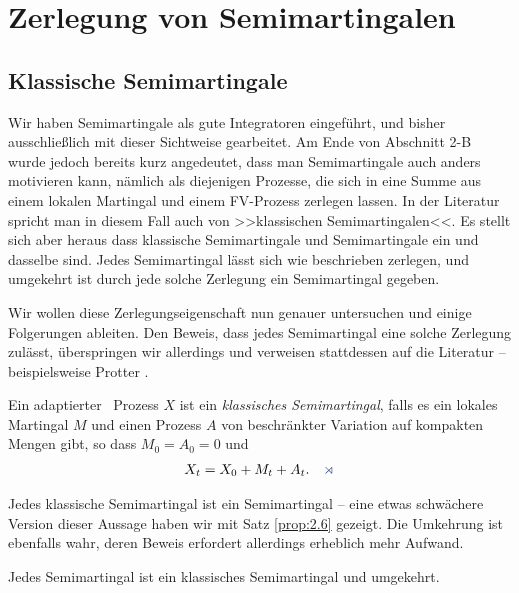 \chapter{Zerlegung von Semimartingalen}

\section{Klassische Semimartingale}

Wir haben Semimartingale als gute Integratoren eingeführt, und bisher
ausschließlich mit dieser Sichtweise gearbeitet. Am Ende von Abschnitt 2-B wurde
jedoch bereits kurz angedeutet, dass man Semimartingale auch anders
motivieren kann, nämlich als diejenigen Prozesse, die sich in eine Summe aus
einem lokalen Martingal und einem FV-Prozess zerlegen lassen. In der Literatur
spricht man in diesem Fall auch von >>klassischen Semimartingalen<<.
Es stellt sich aber heraus dass klassische Semimartingale und Semimartingale ein
und dasselbe sind. Jedes Semimartingal lässt sich wie beschrieben
zerlegen, und umgekehrt ist durch jede solche Zerlegung ein Semimartingal
gegeben.

Wir wollen diese Zerlegungseigenschaft nun genauer untersuchen und einige
Folgerungen ableiten. Den Beweis, dass jedes Semimartingal eine solche Zerlegung
zulässt, überspringen wir allerdings und verweisen stattdessen auf die Literatur
-- beispielsweise Protter \cite{Protter:2004wfa}.

\begin{definition}
\label{defn:3.1}
Ein adaptierter \cadlag\ Prozess $X$ ist ein
\emph{klassisches Semimartingal}, falls es ein lokales Martingal $M$ und einen
Prozess $A$ von beschränkter Variation auf kompakten Mengen gibt, so dass
$M_0=A_0=0$ und 
\begin{align*}
X_t=X_0+M_t+A_t.\fish
\end{align*}
\end{definition}


Jedes klassische Semimartingal ist ein Semimartingal -- eine etwas schwächere
Version dieser Aussage haben wir mit Satz \ref{prop:2.6} gezeigt. Die Umkehrung
ist ebenfalls wahr, deren Beweis erfordert allerdings erheblich mehr Aufwand.

\begin{theorem}
\label{semi}
\label{prop:3.1}
 Jedes Semimartingal ist ein klassisches
  Semimartingal und umgekehrt.
\end{theorem}


